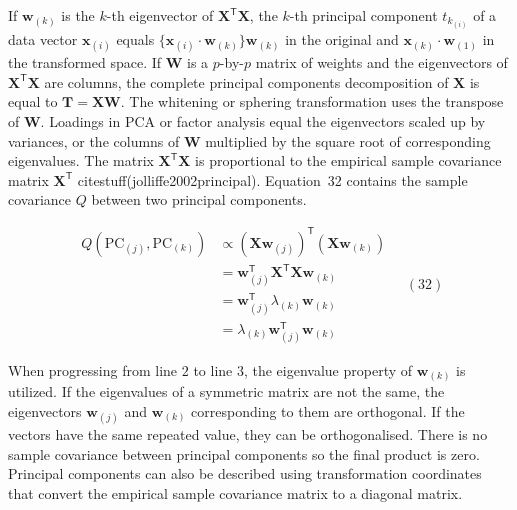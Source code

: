 \documentclass[preprint,12pt]{elsarticle}
\begin{document}
If $\mathbf{w}_{\left(k\right)}$ is the $k$-th eigenvector of $\mathbf{X}^{\mathsf{T}}\mathbf{X}$, the $k$-th principal component $t_{k_{\left(i\right)}}$ of a data vector $\mathbf{x}_{\left(i\right)}$ equals $\{\mathbf{x}_{\left(i\right)} \cdot \mathbf{w}_{\left(k\right)}\} \mathbf{w}_{\left(k\right)}$ in the original and $\mathbf{x}_{\left(k\right)} \cdot \mathbf{w}_{\left(1\right)}$ in the transformed space. If $\mathbf{W}$ is a $p$-by-$p$ matrix of weights and the eigenvectors of $\mathbf{X}^{\mathsf{T}}\mathbf{X}$ are columns, the complete principal components decomposition of $\mathbf{X}$ is equal to $\mathbf{T} =\mathbf{X} \mathbf{W}$. The whitening or sphering transformation uses the transpose of $\mathbf{W}$. Loadings in PCA or factor analysis equal the eigenvectors scaled up by variances, or the columns of $\mathbf{W}$ multiplied by the square root of corresponding eigenvalues. The matrix $\mathbf{X}^{\mathsf{T}}\mathbf{X}$ is proportional to the empirical sample covariance matrix $\mathbf{X}^{\mathsf{T}}$ citestuff(jolliffe2002principal). Equation~32 contains the sample covariance $Q$ between two principal components.

\begin{equation}
	\begin{aligned}
        Q(\mathrm{PC}_{(j)},\mathrm{PC}_{\left(k\right)})&\propto (\mathbf{X} \mathbf{w}_{(j)})^{\mathsf{T}}(\mathbf{X} \mathbf{w}_{\left(k\right)})\\&=\mathbf{w}_{(j)}^{\mathsf{T}}\mathbf{X}^{\mathsf{T}}\mathbf{X} \mathbf{w}_{\left(k\right)}\\&=\mathbf{w}_{(j)}^{\mathsf{T}}\lambda_{\left(k\right)}\mathbf{w}_{\left(k\right)}\\&=\lambda_{\left(k\right)}\mathbf{w}_{(j)}^{\mathsf{T}}\mathbf{w}_{\left(k\right)}
    \end{aligned}
	\quad\left(32\right)
\end{equation}

When progressing from line $2$ to line $3$, the eigenvalue property of $\mathbf{w}_{\left(k\right)}$ is utilized. If the eigenvalues of a symmetric matrix are not the same, the eigenvectors $\mathbf{w}_{\left(j\right)}$ and $\mathbf{w}_{\left(k\right)}$ corresponding to them are orthogonal. If the vectors have the same repeated value, they can be orthogonalised. There is no sample covariance between principal components so the final product is zero. Principal components can also be described using transformation coordinates that convert the empirical sample covariance matrix to a diagonal matrix.
\end{document}
